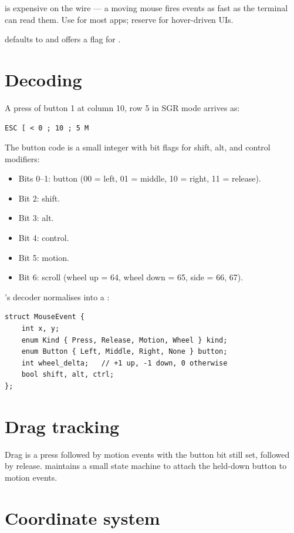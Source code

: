  is expensive on the wire --- a moving mouse fires
events as fast as the terminal can read them. Use  for
most apps; reserve  for hover-driven UIs.

\maya{} defaults to  and offers a flag for
.

\section{Decoding}

A press of button 1 at column 10, row 5 in SGR mode arrives as:

\begin{lstlisting}
ESC [ < 0 ; 10 ; 5 M
\end{lstlisting}

The button code is a small integer with bit flags for shift,
alt, and control modifiers:

\begin{itemize}[leftmargin=*]
  \item Bits 0--1: button (00 = left, 01 = middle, 10 = right,
    11 = release).
  \item Bit 2: shift.
  \item Bit 3: alt.
  \item Bit 4: control.
  \item Bit 5: motion.
  \item Bit 6: scroll (wheel up = 64, wheel down = 65, side =
    66, 67).
\end{itemize}

\maya{}'s decoder normalises into a :

\begin{lstlisting}
struct MouseEvent {
    int x, y;
    enum Kind { Press, Release, Motion, Wheel } kind;
    enum Button { Left, Middle, Right, None } button;
    int wheel_delta;   // +1 up, -1 down, 0 otherwise
    bool shift, alt, ctrl;
};
\end{lstlisting}

\section{Drag tracking}

Drag is a press followed by motion events with the button bit
still set, followed by release. \maya{} maintains a small state
machine to attach the held-down button to motion events.

\section{Coordinate system}

